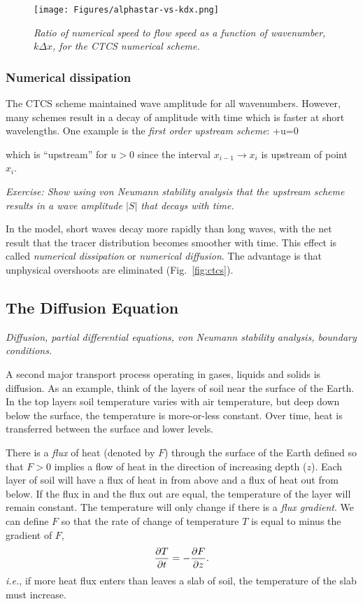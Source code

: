 \begin{figure}
	\scalebox{0.19} {\texttt{[image: Figures/alphastar-vs-kdx.png]}}
	\caption{\textsl{Ratio of numerical speed to flow speed as a function of wavenumber, $k\Delta x$, for the CTCS numerical scheme.}}
	\label{fig:disperse}
\end{figure}


\subsubsection{Numerical dissipation}

The CTCS scheme maintained wave amplitude for all
wavenumbers. However, many schemes result in a decay of amplitude with
time which is faster at short wavelengths. One example is the {\em
	first order upstream scheme}:
\BEQ
{}+u=0
\EEQ

which is ``upstream'' for $u>0$ since the interval $x_{i-1}\rightarrow
x_i$ is upstream of point $x_i$. 

{\em Exercise: Show using von Neumann stability analysis that the
	upstream scheme results in a wave amplitude $|S|$ that decays with
	time.}

In the model, short waves decay more rapidly than long waves, with the
net result that the tracer distribution becomes smoother with
time. This effect is called {\em numerical dissipation} or {\em
	numerical diffusion}. The advantage is that unphysical overshoots are
eliminated (Fig.~\ref{fig:ctcs}).

\subsection{The Diffusion Equation}

\textsl{Diffusion, partial differential equations, 
	von Neumann stability analysis, boundary conditions.}

A second major transport process operating in gases, liquids and
solids is diffusion. As an example, think of the layers of soil near
the surface of the Earth. In the top layers soil temperature varies
with air temperature, but deep down below the surface, the temperature
is more-or-less constant. Over time, heat is transferred between the
surface and lower levels.

There is a {\em flux} of heat (denoted by $F$) through the surface
of the Earth defined so that $F>0$ implies a flow of heat in the
direction of increasing depth ($z$). Each layer of soil will have a
flux of heat in from above and a flux of heat out from below. If
the flux in and the flux out are equal, the temperature of the layer
will remain constant. The temperature will only change if there is a
{\em flux gradient}. We can define $F$ so that the rate of change of
temperature $T$ is equal to minus the gradient of $F$,
\begin{equation}
	\frac{\partial T}{\partial t} = -\frac{\partial F}{\partial z}.
	\label{eq:flux-tend}
\end{equation}
{\em i.e.}, if more heat flux enters than leaves a slab of soil,
the temperature of the slab must increase.

